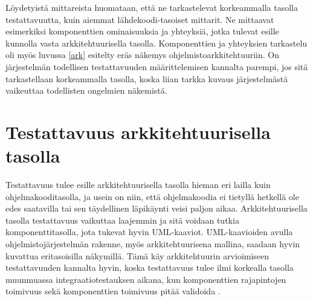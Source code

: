 \documentclass[finnish]{tktltiki2}
\theoremstyle{definition}
\theoremstyle{remark}
\begin{document}


 
Löydetyistä mittareista huomataan, että ne tarkastelevat korkeammalla tasolla testattavuutta, kuin aiemmat lähdekoodi-tasoiset mittarit. Ne mittaavat esimerkiksi komponenttien ominaisuuksia ja yhteyksiä, jotka tulevat esille kunnolla vasta arkkitehtuurisella tasolla. Komponenttien ja yhteyksien tarkastelu oli myös luvussa \ref{ark} esitelty eräs näkemys ohjelmistoarkkitehtuuriin. On järjestelmän todellisen testattavuuden määrittelemisen kannalta parempi, jos sitä tarkastellaan korkeammalla tasolla, koska liian tarkka kuvaus järjestelmästä vaikeuttaa todellisten ongelmien näkemistä.  

\section{Testattavuus arkkitehtuurisella tasolla}

Testattavuus tulee esille arkkitehtuurisella tasolla hieman eri lailla kuin ohjelmakooditasolla, ja usein on niin, että ohjelmakoodia ei tietyllä hetkellä ole edes saatavilla tai sen täydellinen läpikäynti veisi paljon aikaa. Arkkitehtuurisella tasolla testattavuus vaikuttaa laajemmin ja sitä voidaan tutkia komponenttitasolla, jota tukevat hyvin UML-kaaviot. UML-kaavioiden avulla ohjelmistojärjestelmän rakenne, myös arkkitehtuurisena mallina, saadaan hyvin kuvattua eritasoisilla näkymillä. Tämä käy arkkitehtuurin arvioimiseen testattavuuden kannalta hyvin, koska testattavuus tulee ilmi korkealla tasolla muunmuassa integraatiotestauksen aikana, kun komponenttien rajapintojen toimivuus sekä komponenttien toimivuus pitää validoida \citep[s. 65]{Eickelmann:1996:MOS:243327.243602}.
\end{document}
